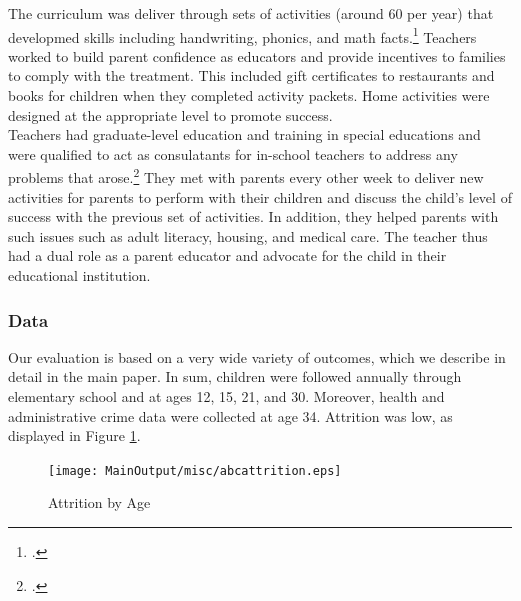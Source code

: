 \noindent The curriculum was deliver through sets of activities (around 60 per year) that developmed skills including handwriting, phonics, and math facts.\footnote{\cite{Campbell-Ramey_1989_Preschool-vs-School-age}.} Teachers worked to build parent confidence as educators and provide incentives to families to comply with the treatment. This included gift certificates to restaurants and books for children when they completed activity packets. Home activities were designed at the appropriate level to promote success.\\

\noindent Teachers had graduate-level education and training in special educations and were qualified to act as consulatants for in-school teachers to address any problems that arose.\footnote{\cite{Ramey_Campbell_1991_childreninpoverty}.} They met with parents every other week to deliver new activities for parents to perform with their children and discuss the child's level of success with the previous set of activities. In addition, they helped parents with such issues such as adult literacy, housing, and medical care. The teacher thus had a dual role as a parent educator and advocate for the child in their educational institution.

\subsubsection{Data} \label{appendix:data}

Our evaluation is based on a very wide variety of outcomes, which we describe in detail in the main paper. In sum, children were followed annually through elementary school and at ages 12, 15, 21, and 30. Moreover, health and administrative crime data were collected at age 34.  Attrition was low, as displayed in Figure \ref{fig:attrition}.\\

\begin{figure}[H]
\caption{Attrition by Age} \label{fig:attrition}
    \centering
  \texttt{[image: MainOutput/misc/abcattrition.eps]}
\end{figure}

